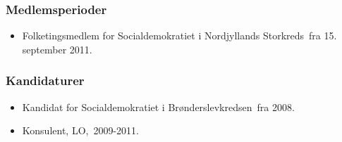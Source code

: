 \documentclass[11pt, a4paper]{awesome-cv}
\begin{document}
\begin{cvletter}
\subsubsection*{Medlemsperioder}
\begin{itemize}
\item Folketingsmedlem for Socialdemokratiet i Nordjyllands Storkreds fra 15. september 2011.
\end{itemize}
\subsubsection*{Kandidaturer}
\begin{itemize}
\item Kandidat for Socialdemokratiet i Brønderslevkredsen fra 2008.
\end{itemize}
\begin{itemize}
\item Konsulent, LO, 2009-2011.
\end{itemize}
\end{cvletter}
\end{document}
